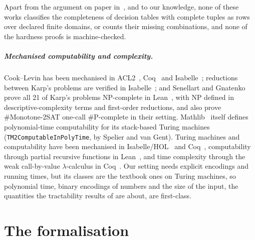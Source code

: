 \documentclass[a4paper,UKenglish,cleveref,autoref,thm-restate]{lipics-v2021}
\begin{document}
Apart from the argument on paper in~\cite{PaperA}, and to our knowledge, none of these works
classifies the completeness of decision tables with complete
tuples as rows over declared finite domains, or counts their missing combinations, and none of the
hardness proofs is machine-checked.

\subparagraph*{Mechanised computability and complexity.}
Cook--Levin has been mechanised in ACL2~\cite{GamboaCowles2004}, Coq~\cite{GaeherKunze2021} and
Isabelle~\cite{Cook_Levin-AFP}; reductions between Karp's problems are verified in
Isabelle~\cite{PolyReductionsIsabelle}; and Senellart and Gnatenko prove all 21 of Karp's
problems NP-complete in Lean~\cite{SenellartGnatenko2026}, with NP defined in
descriptive-complexity terms and first-order reductions, and also prove \#Monotone-2SAT one-call
\#P-complete in their setting. Mathlib~\cite{mathlib2020} itself defines polynomial-time computability for its stack-based
Turing machines (\lstinline{TM2ComputableInPolyTime}, by Spelier and van Gent). Turing machines
and computability have been mechanised in Isabelle/HOL~\cite{XuZhangUrban2013} and Coq~\cite{ForsterKunzeWuttke2020}, computability through
partial recursive functions in Lean~\cite{Carneiro2019}, and time complexity through the weak
call-by-value $\lambda$-calculus in Coq~\cite{ForsterKSW2021}. Our setting needs explicit encodings and running
times, but its classes are the textbook ones on Turing machines, so polynomial time, binary
encodings of numbers and the size of the input, the quantities the tractability results of
 are about, are first-class.

\section{The formalisation}
\label{sec:formal}
\end{document}
